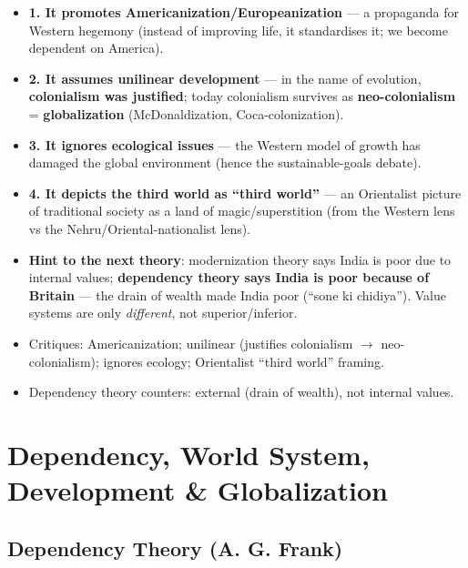 \begin{CriticalPoint}
\begin{itemize}
    \item \textbf{1. It promotes Americanization/Europeanization} --- a propaganda for Western hegemony (instead of improving life, it standardises it; we become dependent on America).
    \item \textbf{2. It assumes unilinear development} --- in the name of evolution, \textbf{colonialism was justified}; today colonialism survives as \textbf{neo-colonialism} = \textbf{globalization} (McDonaldization, Coca-colonization).
    \item \textbf{3. It ignores ecological issues} --- the Western model of growth has damaged the global environment (hence the sustainable-goals debate).
    \item \textbf{4. It depicts the third world as ``third world''} --- an Orientalist picture of traditional society as a land of magic/superstition (from the Western lens vs the Nehru/Oriental-nationalist lens).
    \item \textbf{Hint to the next theory}: modernization theory says India is poor due to internal values; \textbf{dependency theory says India is poor because of Britain} --- the drain of wealth made India poor (``sone ki chidiya''). Value systems are only \textit{different}, not superior/inferior.
\end{itemize}
\end{CriticalPoint}

\begin{QuickRevision}
\begin{itemize}
    \item Critiques: Americanization; unilinear (justifies colonialism $\rightarrow$ neo-colonialism); ignores ecology; Orientalist ``third world'' framing.
    \item Dependency theory counters: external (drain of wealth), not internal values.
\end{itemize}
\end{QuickRevision}

\sectiondivider

\section{Dependency, World System, Development \& Globalization}

\subsection{Dependency Theory (A. G. Frank)}

